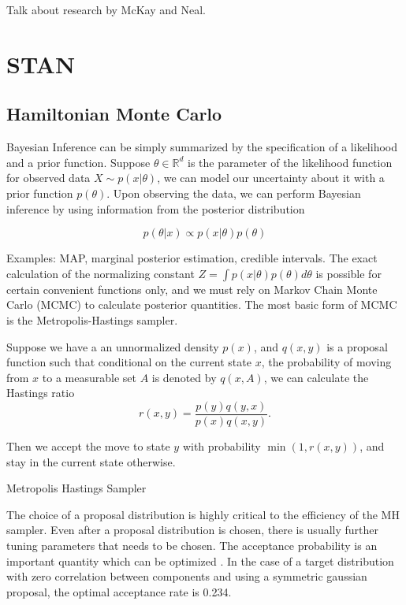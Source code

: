 \documentclass[]{report}
\begin{document}
Talk about research by McKay and Neal.




\chapter{STAN}
\section{Hamiltonian Monte Carlo}

Bayesian Inference can be simply summarized by the specification of a likelihood and a prior function. Suppose $\theta \in \mathbb{R}^d$ is the parameter of the likelihood function for observed data $X \sim p(x| \theta)$, we can
model our uncertainty about it with a prior function $p(\theta)$. Upon observing the data, we can perform Bayesian inference by using information from the posterior distribution 

\[ p(\theta | x ) \propto p(x | \theta) p(\theta) \]

Examples: MAP, marginal posterior estimation, credible intervals. The exact calculation of the normalizing constant $Z = \int p(x | \theta) p(\theta) d\theta $ is possible for certain convenient functions only, and we must rely on Markov Chain Monte Carlo (MCMC) to calculate posterior quantities. The most basic form of MCMC is the Metropolis-Hastings sampler. 


Suppose we have a an unnormalized density $p(x)$, and $q(x,y)$ is a proposal function such that conditional on the current state $x$, the probability of moving from $x$ to a measurable set $A$ is denoted by $q(x,A)$, we can calculate the Hastings ratio
\[ r(x,y) = \frac{p(y)q(y,x)}{p(x)q(x,y)}. \]

Then we accept the move to state $y$ with probability $ \min (1, r(x,y)) $, and stay in the current state otherwise.

\begin{algorithm}
\caption{Metropolis Hastings Sampler}


 
 
\end{algorithm}


The choice of a proposal distribution is highly critical to the efficiency of the MH sampler. Even after a proposal distribution is chosen, there is usually further tuning parameters that needs to be chosen. The acceptance probability is an important quantity which 
can be optimized . In the case of a target distribution with zero correlation between components and using a symmetric gaussian proposal, the optimal acceptance rate is 0.234.\cite{roberts1997weak,gelman1996efficient,roberts2001optimal} 
\end{document}
